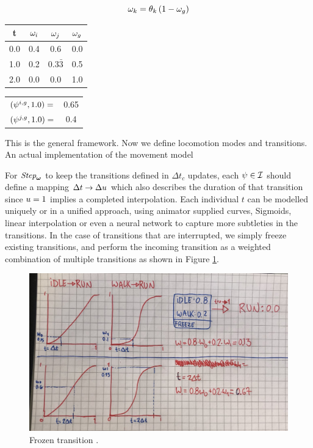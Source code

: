 \begin{equation}
\omega_k = \theta_k \, (1-\omega_g)  
\end{equation}
\begin{center}
 \begin{tabular}{||c c c c||} 
 \hline
 t & $\omega_i$ & $\omega_j$ & $\omega_g$  \\ [0.5pt] 
 \hline\hline
 0.0 & 0.4 & 0.6 & 0.0 \\ 
 \hline
 1.0 & 0.2 & 0.3$\bar{3}$ & 0.5 \\
 \hline
 2.0  & 0.0 & 0.0 & 1.0 \\
 \hline
\end{tabular}
\end{center}

\begin{center}
 \begin{tabular}{||c c||} 
 $(\psi^{i,g},1.0)=$ & 0.65\\ 
 $(\psi^{j,g},1.0)=$ & 0.4\\ 
\end{tabular}
\end{center}

This is the general framework. Now we define locomotion modes and transitions. An actual implementation of the movement model

For $\textit{Step}_{\boldsymbol{\omega }}$ to keep the transitions defined in $\Delta{t}_c$ updates, each $\psi\in\mathcal{I}$ should define a mapping $\Delta{t} \rightarrow \Delta u$ which also describes the duration of that transition since $u=1$ implies a completed interpolation. Each individual $t$ can be modelled uniquely or in a unified approach, using animator supplied curves, Sigmoids, linear interpolation or even a neural network to capture more subtleties in the transitions. In the case of transitions that are interrupted, we simply freeze existing transitions, and perform the incoming transition as a weighted combination of multiple transitions as shown in Figure \ref{fig:frozen-transition}. 
\begin{figure}
    \centering
    \includegraphics[width=0.75\columnwidth]{img/frozen-transitions}
    \caption{Frozen transition .}
  \label{fig:frozen-transition}
\end{figure}

